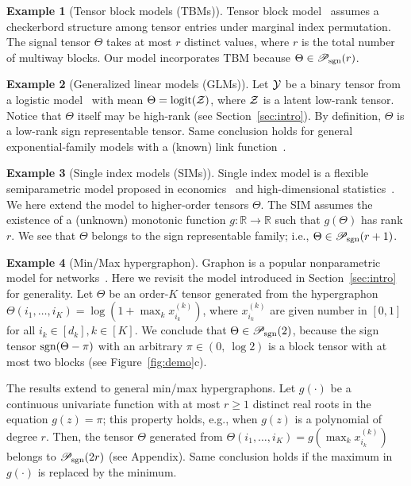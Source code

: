\documentclass[11pt]{article}
\theoremstyle{plain}
\theoremstyle{definition}
\newtheorem{example}{Example}
\def\sign{\textup{sgn}}
\def\caliP{\mathscr{P}_{\textup{sgn}}}
\begin{document}
\begin{example}[Tensor block models (TBMs)] Tensor block model~\citep{wang2019multiway,chi2020provable} assumes a checkerbord structure among tensor entries under marginal index permutation. The signal tensor $\Theta$ takes at most $r$ distinct values, where $r$ is the total number of multiway blocks. Our model incorporates TBM because $\Theta \in \caliP(r)$. \\
\end{example}


\begin{example}[Generalized linear models (GLMs)] Let $\mathcal{Y}$ be a binary tensor from a logistic model~\citep{wang2018learning} with mean $\Theta=\text{logit}(\mathcal{Z})$, where $\mathcal{Z}$ is a latent low-rank tensor. Notice that $\Theta$ itself may be high-rank (see Section~\ref{sec:intro}). By definition, $\Theta$ is a low-rank sign representable tensor. Same conclusion holds for general exponential-family models with a (known) link function~\citep{hong2020generalized}. \\
\end{example}

\begin{example}[Single index models (SIMs)] Single index model is a flexible semiparametric model proposed in economics~\citep{robinson1988root} and high-dimensional statistics~\citep{balabdaoui2019least,ganti2017learning}. We here extend the model to higher-order tensors $\Theta$. The SIM assumes the existence of a (unknown) monotonic function $g\colon \mathbb{R}\to \mathbb{R}$ such that $g(\Theta)$ has rank $r$. We see that $\Theta$ belongs to the sign representable family; i.e., $\Theta\in \caliP(r+1)$. \\
\end{example}

\begin{example}[Min/Max hypergraphon]\label{eq:example}Graphon is a popular nonparametric model for networks~\citep{chan2014consistent,xu2018rates}. Here we revisit the model introduced in Section~\ref{sec:intro} for generality. Let $\Theta$ be an order-$K$ tensor generated from the hypergraphon $\Theta(i_1,\ldots,i_K)=\log(1+\max_kx^{(k)}_{i_k})$, where $x^{(k)}_{i_k}$ are given number in $[0,1]$ for all $i_k\in[d_k], k\in[K]$. We conclude that $\Theta \in \caliP(2)$, because the sign tensor $\sign(\Theta-\pi)$ with an arbitrary $\pi\in(0,\ \log 2)$ is a block tensor with at most two blocks (see Figure~\ref{fig:demo}c).

The results extend to general min/max hypergraphons. Let $g(\cdot)$ be a continuous univariate function with at most $r\geq 1$ distinct real roots in the equation $g(z)=\pi$; this property holds, e.g., when $g(z)$ is a polynomial of degree $r$. Then, the tensor $\Theta$ generated from $\Theta(i_1,\ldots,i_K)=g(\max_kx^{(k)}_{i_k})$ belongs to $\caliP(2r)$ (see Appendix). Same conclusion holds if the maximum in $g(\cdot)$ is replaced by the minimum. 
\end{example}
\end{document}
